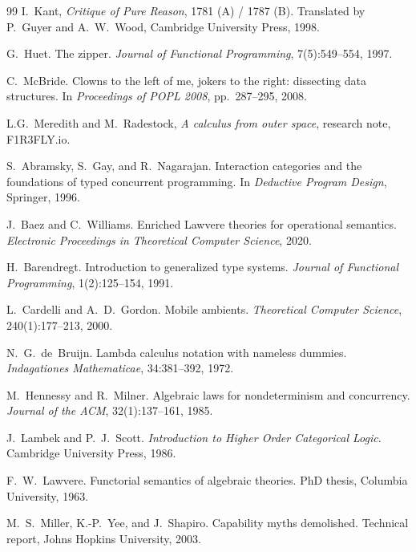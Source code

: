 \begin{thebibliography}{99}
I.~Kant, \emph{Critique of Pure Reason}, 1781 (A) / 1787 (B). Translated by P.~Guyer and A.~W.~Wood, Cambridge University Press, 1998.

G.~Huet. The zipper. \emph{Journal of Functional Programming}, 7(5):549--554, 1997.

C.~McBride. Clowns to the left of me, jokers to the right: dissecting data structures. In \emph{Proceedings of POPL 2008}, pp.~287--295, 2008.

L.G.~Meredith and M.~Radestock, \emph{A calculus from outer space}, research note, F1R3FLY.io.




S.~Abramsky, S.~Gay, and R.~Nagarajan.
\newblock Interaction categories and the foundations of typed concurrent programming.
\newblock In \emph{Deductive Program Design}, Springer, 1996.

J.~Baez and C.~Williams.
\newblock Enriched Lawvere theories for operational semantics.
\newblock \emph{Electronic Proceedings in Theoretical Computer Science}, 2020.

H.~Barendregt.
\newblock Introduction to generalized type systems.
\newblock \emph{Journal of Functional Programming}, 1(2):125--154, 1991.

L.~Cardelli and A.~D.~Gordon.
\newblock Mobile ambients.
\newblock \emph{Theoretical Computer Science}, 240(1):177--213, 2000.

N.~G.~de~Bruijn.
\newblock Lambda calculus notation with nameless dummies.
\newblock \emph{Indagationes Mathematicae}, 34:381--392, 1972.

M.~Hennessy and R.~Milner.
\newblock Algebraic laws for nondeterminism and concurrency.
\newblock \emph{Journal of the ACM}, 32(1):137--161, 1985.

J.~Lambek and P.~J.~Scott.
\newblock \emph{Introduction to Higher Order Categorical Logic}.
\newblock Cambridge University Press, 1986.

F.~W.~Lawvere.
\newblock Functorial semantics of algebraic theories.
\newblock PhD thesis, Columbia University, 1963.

M.~S.~Miller, K.-P.~Yee, and J.~Shapiro.
\newblock Capability myths demolished.
\newblock Technical report, Johns Hopkins University, 2003.


\end{thebibliography}
